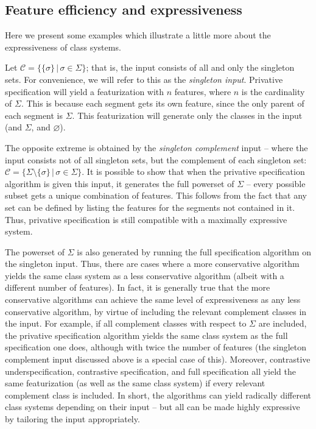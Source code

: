 \documentclass[11pt, oneside]{article}   	%
\begin{document}
\subsection{Feature efficiency and expressiveness}

Here we present some examples which illustrate a little more about the expressiveness of class systems.

Let $\mathcal C = \{ \{\sigma\} \, | \, \sigma \in \Sigma \}$; that is, the input consists of all and only the singleton sets. For convenience, we will refer to this as the \textit{singleton input}. Privative specification will yield a featurization with $n$ features, where $n$ is the cardinality of $\Sigma$. This is because each segment gets its own feature, since the only parent of each segment is $\Sigma$. This featurization will generate only the classes in the input (and $\Sigma$, and $\varnothing$).

The opposite extreme is obtained by the \textit{singleton complement} input -- where the input consists not of all singleton sets, but the complement of each singleton set:  $\mathcal C = \{ \Sigma \setminus \{\sigma\} \, | \, \sigma \in \Sigma \}$. It is possible to show that when the privative specification algorithm is given this input, it generates the full powerset of $\Sigma$ -- every possible subset gets a unique combination of features. This follows from the fact that any set can be defined by listing the features for the segments not contained in it. Thus, privative specification is still compatible with a maximally expressive system.

The powerset of $\Sigma$ is also generated by running the full specification algorithm on the singleton input. Thus, there are cases where a more conservative algorithm yields the same class system as a less conservative algorithm (albeit with a different number of features). In fact, it is generally true that the more conservative algorithms can achieve the same level of expressiveness as any less conservative algorithm, by virtue of including the relevant complement classes in the input. For example, if all complement classes with respect to $\Sigma$ are included, the privative specification algorithm yields the same class system as the full specification one does, although with twice the number of features (the singleton complement input discussed above is a special case of this). Moreover, contrastive underspecification, contrastive specification, and full specification all yield the same featurization (as well as the same class system) if every relevant complement class is included. In short, the algorithms can yield radically different class systems depending on their input -- but all can be made highly expressive by tailoring the input appropriately.
\end{document}
